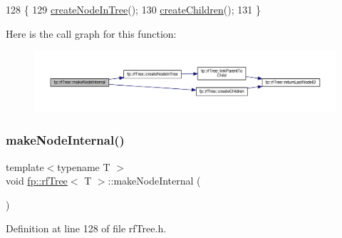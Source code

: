 \begin{DoxyCode}
128                                               \{
129                     \hyperlink{classfp_1_1rfTree_aaf9d8cdfbb1d10da53a375ea8204e393}{createNodeInTree}();
130                     \hyperlink{classfp_1_1rfTree_ad226037e7f93c0fa2a1a960e19a87bed}{createChildren}();
131                 \}
\end{DoxyCode}
Here is the call graph for this function\+:
\nopagebreak
\begin{figure}[H]
\begin{center}
\leavevmode
\includegraphics[width=350pt]{classfp_1_1rfTree_aaf7bbdde5f7313c3e84853bbf5fdf792_cgraph}
\end{center}
\end{figure}
\mbox{\label{classfp_1_1rfTree_aaf7bbdde5f7313c3e84853bbf5fdf792}} 
\subsubsection{\texorpdfstring{make\+Node\+Internal()}{makeNodeInternal()}\hspace{0.1cm}{\footnotesize\ttfamily [2/2]}}
{\footnotesize\ttfamily template$<$typename T $>$ \\
void \hyperlink{classfp_1_1rfTree}{fp\+::rf\+Tree}$<$ T $>$\+::make\+Node\+Internal (\begin{DoxyParamCaption}{ }\end{DoxyParamCaption})\hspace{0.3cm}{\ttfamily [inline]}}



Definition at line 128 of file rf\+Tree.\+h.


